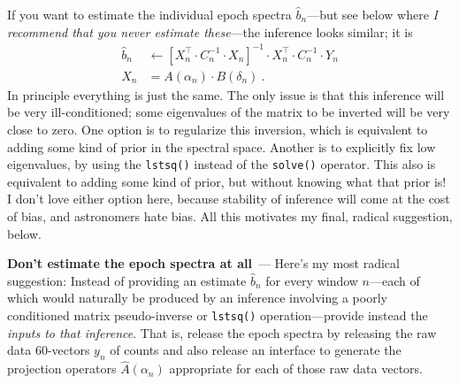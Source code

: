 \documentclass[11pt]{article}
\renewcommand{\paragraph}[1]{\medskip\par\noindent\textbf{#1}~---}
\begin{document}
If you want to estimate the individual epoch spectra $\hat{b}_n$---but see below where \emph{I recommend that you never estimate these}---the inference looks similar; it is
\begin{align}
  \hat{b}_n &\leftarrow [X_n^\top\cdot C_n^{-1}\cdot X_n]^{-1}\cdot X_n^\top\cdot C_n^{-1}\cdot Y_n\\
  X_n &= A(\alpha_n)\cdot B(\delta_n)~.
\end{align}
In principle everything is just the same.
The only issue is that this inference will be very ill-conditioned; some eigenvalues of the matrix to be inverted will be very close to zero.
One option is to regularize this inversion, which is equivalent to adding some kind of prior in the spectral space.
Another is to explicitly fix low eigenvalues, by using the \texttt{lstsq()} instead of the \texttt{solve()} operator.
This also is equivalent to adding some kind of prior, but without knowing what that prior is!
I don't love either option here, because stability of inference will come at the cost of bias, and astronomers hate bias.
All this motivates my final, radical suggestion, below.

\paragraph{Don't estimate the epoch spectra at all}
Here's my most radical suggestion: Instead of providing an estimate $\hat{b}_n$ for every window $n$---each of which would naturally be produced by an inference involving a poorly conditioned matrix pseudo-inverse or \texttt{lstsq()} operation---provide instead the \emph{inputs to that inference}.
That is, release the epoch spectra by releasing the raw data 60-vectors $y_n$ of counts and also release an interface to generate the projection operators $\hat{A}(\alpha_n)$ appropriate for each of those raw data vectors.
\end{document}
